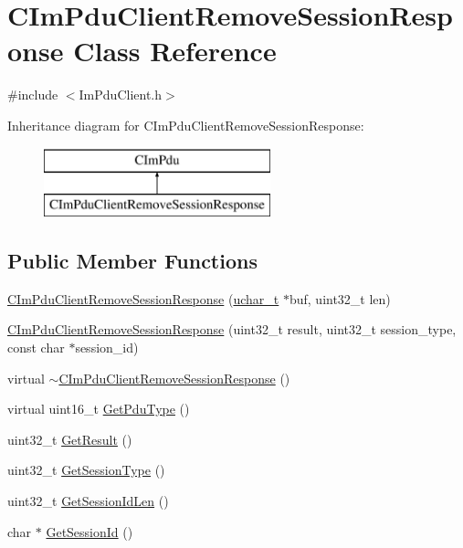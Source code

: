 \hypertarget{class_c_im_pdu_client_remove_session_response}{}\section{C\+Im\+Pdu\+Client\+Remove\+Session\+Response Class Reference}
\label{class_c_im_pdu_client_remove_session_response}


{\ttfamily \#include $<$Im\+Pdu\+Client.\+h$>$}

Inheritance diagram for C\+Im\+Pdu\+Client\+Remove\+Session\+Response\+:\begin{figure}[H]
\begin{center}
\leavevmode
\includegraphics[height=2.000000cm]{class_c_im_pdu_client_remove_session_response}
\end{center}
\end{figure}
\subsection*{Public Member Functions}
\begin{DoxyCompactItemize}
\item 
\hyperlink{class_c_im_pdu_client_remove_session_response_a1fac1fa01717c335d12213d662256e41}{C\+Im\+Pdu\+Client\+Remove\+Session\+Response} (\hyperlink{base_2ostype_8h_a124ea0f8f4a23a0a286b5582137f0b8d}{uchar\+\_\+t} $\ast$buf, uint32\+\_\+t len)
\item 
\hyperlink{class_c_im_pdu_client_remove_session_response_ada953b24803b96dd07c838ea43d8f185}{C\+Im\+Pdu\+Client\+Remove\+Session\+Response} (uint32\+\_\+t result, uint32\+\_\+t session\+\_\+type, const char $\ast$session\+\_\+id)
\item 
virtual \hyperlink{class_c_im_pdu_client_remove_session_response_af837e0fea6a584fc1d9e2af63bace94b}{$\sim$\+C\+Im\+Pdu\+Client\+Remove\+Session\+Response} ()
\item 
virtual uint16\+\_\+t \hyperlink{class_c_im_pdu_client_remove_session_response_af621eaa3295a828b830ff163fe86b240}{Get\+Pdu\+Type} ()
\item 
uint32\+\_\+t \hyperlink{class_c_im_pdu_client_remove_session_response_addfffe7be620f66247937a9ecb12df9e}{Get\+Result} ()
\item 
uint32\+\_\+t \hyperlink{class_c_im_pdu_client_remove_session_response_a663c184732deeace3b49636ae8e2ebf6}{Get\+Session\+Type} ()
\item 
uint32\+\_\+t \hyperlink{class_c_im_pdu_client_remove_session_response_ac177096bcd025550514ac057500750d7}{Get\+Session\+Id\+Len} ()
\item 
char $\ast$ \hyperlink{class_c_im_pdu_client_remove_session_response_a7955a56000b289fbf56d36e416cd3cb9}{Get\+Session\+Id} ()
\end{DoxyCompactItemize}
